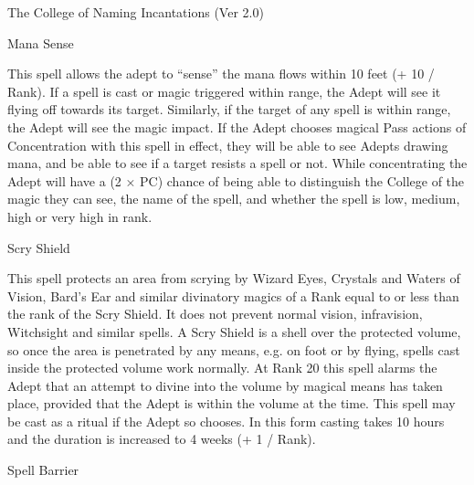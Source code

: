 \begin{Chapter}{The College of Naming Incantations (Ver 2.0)}
\begin{spell}[S-7]{Mana Sense}
\begin{effects}
This spell allows the adept to “sense” the mana flows within 10 feet
(+ 10 / Rank). If a spell is cast or magic triggered within range, the
Adept will see it flying off towards its target. Similarly, if the
target of any spell is within range, the Adept will see the magic
impact.  If the Adept chooses magical Pass actions of Concentration
with this spell in effect, they will be able to see Adepts drawing
mana, and be able to see if a target resists a spell or not.  While
concentrating the Adept will have a (2 × PC) chance of being able to
distinguish the College of the magic they can see, the name of the
spell, and whether the spell is low, medium, high or very high in
rank.
\end{effects}
\end{spell}

\begin{spell}[S-8]{Scry Shield}

\begin{effects}
This spell protects an area from scrying by Wizard Eyes, Crystals and
Waters of Vision, Bard’s Ear and similar divinatory magics of a Rank
equal to or less than the rank of the Scry Shield. It does not prevent
normal vision, infravision, Witchsight and similar spells.  A Scry
Shield is a shell over the protected volume, so once the area is
penetrated by any means, e.g. on foot or by flying, spells cast inside
the protected volume work normally. At Rank 20 this spell alarms the
Adept that an attempt to divine into the volume by magical means has
taken place, provided that the Adept is within the volume at the time.
This spell may be cast as a ritual if the Adept so chooses. In this
form casting takes 10 hours and the duration is increased to 4 weeks
(+ 1 / Rank).
\end{effects}
\end{spell}

\begin{spell}[S-9]{Spell Barrier}


\end{spell}
\end{Chapter}
